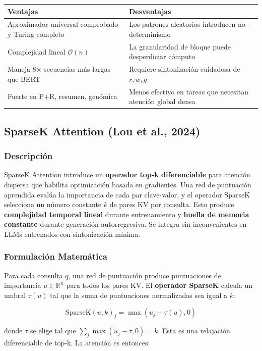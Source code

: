 \documentclass[11pt,a4paper]{article}
\begin{document}
\begin{tabular}{|p{4cm}|p{4cm}|}
\hline
\textbf{Ventajas} & \textbf{Desventajas} \\
\hline
Aproximador universal comprobado y Turing completo & Los patrones aleatorios introducen no-determinismo \\
Complejidad lineal $\mathcal{O}(n)$ & La granularidad de bloque puede desperdiciar cómputo \\
Maneja 8× secuencias más largas que BERT & Requiere sintonización cuidadosa de $r, w, g$ \\
Fuerte en P+R, resumen, genómica & Menos efectivo en tareas que necesitan atención global densa \\
\hline
\end{tabular}

\subsection{SparseK Attention (Lou et al., 2024)}

\subsubsection{Descripción}

SparseK Attention introduce un \textbf{operador top-k diferenciable} para atención dispersa que habilita optimización basada en gradientes. Una red de puntuación aprendida evalúa la importancia de cada par clave-valor, y el operador SparseK selecciona un número constante $k$ de pares KV por consulta. Esto produce \textbf{complejidad temporal lineal} durante entrenamiento y \textbf{huella de memoria constante} durante generación autorregresiva. Se integra sin inconvenientes en LLMs entrenados con sintonización mínima.

\subsubsection{Formulación Matemática}

Para cada consulta $q$, una red de puntuación produce puntuaciones de importancia $u \in \mathbb{R}^n$ para todos los pares KV. El \textbf{operador SparseK} calcula un umbral $\tau(u)$ tal que la suma de puntuaciones normalizadas sea igual a $k$:

$$
\text{SparseK}(u, k)_j = \max(u_j - \tau(u), 0)
$$

donde $\tau$ se elige tal que $\sum_j \max(u_j - \tau, 0) = k$. Esta es una relajación diferenciable de top-k. La atención es entonces:
\end{document}
